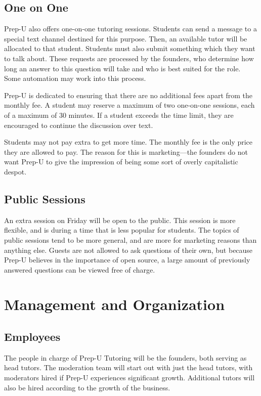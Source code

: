 \documentclass{business}
\begin{document}
    \subsection{One on One}
    Prep-U also offers one-on-one tutoring sessions. Students can send  a message to a special text channel destined for this purpose. Then, an available tutor will be allocated to that student. Students must also submit something which they want to talk about. These requests are processed by the founders, who determine how long an answer to this question will take and who is best suited for the role. Some automation may work into this process.\par
    Prep-U is dedicated to ensuring that there are no additional fees apart from the monthly fee. A student may reserve a maximum of two one-on-one sessions, each of a maximum of 30 minutes. If a student exceeds the time limit, they are encouraged to continue the discussion over text.\par
    Students may not pay extra to get more time. The monthly fee is the only price they are allowed to pay. The reason for this is marketing––the founders do not want Prep-U to give the impression of being some sort of overly capitalistic despot.
    \subsection{Public Sessions}
    An extra session on Friday will be open to the public. This session is more flexible, and is during a time that is less popular for students. The topics of public sessions tend to be more general, and are more for marketing reasons than anything else. Guests are not allowed to ask questions of their own, but because Prep-U believes in the importance of open source, a large amount of previously answered questions can be viewed free of charge. 
    \section{Management and Organization}
    \subsection{Employees}
    The people in charge of Prep-U Tutoring will be the founders, both serving as head tutors. The moderation team will start out with just the head tutors, with moderators hired if Prep-U experiences significant growth. Additional tutors will also be hired according to the growth of the business.
\end{document}
